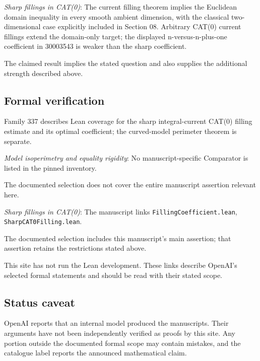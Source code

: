 \documentclass[11pt]{article}
\begin{document}
\textit{Sharp fillings in CAT(0)}: The current filling theorem implies the Euclidean domain inequality in every smooth ambient dimension, with the classical two-dimensional case explicitly included in Section 08. Arbitrary CAT(0) current fillings extend the domain-only target; the displayed n-versus-n-plus-one coefficient in 30003543 is weaker than the sharp coefficient.

The claimed result implies the stated question and also supplies the additional strength described above.

\subsection{Formal verification}
Family 337 describes Lean coverage for the sharp integral-current CAT(0) filling estimate and its optimal coefficient; the curved-model perimeter theorem is separate.

\textit{Model isoperimetry and equality rigidity}: No manuscript-specific Comparator is listed in the pinned inventory.

The documented selection does not cover the entire manuscript assertion relevant here.

\textit{Sharp fillings in CAT(0)}: The manuscript links \texttt{FillingCoefficient.lean}, \texttt{SharpCAT0Filling.lean}.

The documented selection includes this manuscript’s main assertion; that assertion retains the restrictions stated above.

This site has not run the Lean development. These links describe OpenAI’s selected formal statements and should be read with their stated scope.

\subsection{Status caveat}
OpenAI reports that an internal model produced the manuscripts. Their arguments have not been independently verified as proofs by this site. Any portion outside the documented formal scope may contain mistakes, and the catalogue label reports the announced mathematical claim.
\end{document}
